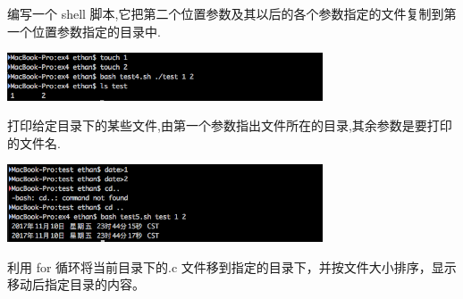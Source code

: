 \documentclass{JNUexp}
\begin{document}
\begin{problem}
编写一个 shell 脚本,它把第二个位置参数及其以后的各个参数指定的文件复制到第一个位置参数指定的目录中.
\end{problem}

\begin{answer}
    
\end{answer}

\begin{image}
    \begin{center}
        \includegraphics[width=0.7\textwidth]{3}
    \end{center}
\end{image}

\begin{problem}
    打印给定目录下的某些文件,由第一个参数指出文件所在的目录,其余参数是要打印的文件名.
\end{problem}

\begin{answer}
    
\end{answer}

\begin{image}
    \begin{center}
        \includegraphics[width=0.7\textwidth]{4}
    \end{center}
\end{image}

\begin{problem}
    利用 for 循环将当前目录下的.c 文件移到指定的目录下，并按文件大小排序，显示移动后指定目录的内容。
\end{problem}

\begin{answer}
    
\end{answer}
\end{document}
